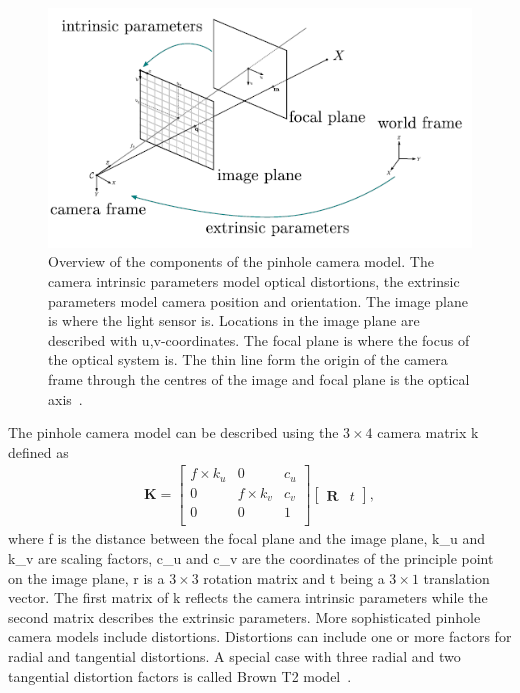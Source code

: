 \begin{figure}[htb]
    \centering
    \includegraphics[width=.85\textwidth]{doc/thesis/0_figures/sfm/pinholeCamera.png}
    \caption{Overview of the components of the pinhole camera model. The camera intrinsic parameters model optical distortions, the extrinsic parameters model camera position and orientation. The image plane is where the light sensor is. Locations in the image plane are described with u,v-coordinates. The focal plane is where the focus of the optical system is. The thin line form the origin of the camera frame through the centres of the image and focal plane is the optical axis~\cite{OpenMVGCameras}.}
    \label{fig:pinhole_cam}
\end{figure} 

The pinhole camera model can be described using the $3\times4$ camera matrix \gls{k} defined as
\begin{align}
    \textbf{K} = \begin{bmatrix}
        f\times k_u & 0           & c_u \\
        0           & f\times k_v & c_v \\
        0           & 0           & 1   \\
    \end{bmatrix} 
    \begin{bmatrix}
        \textbf{R} & t
    \end{bmatrix}, \label{eq:camera_m}
\end{align}
where \gls{f} is the distance between the focal plane and the image plane, \gls{k_u} and \gls{k_v} are scaling factors, \gls{c_u} and \gls{c_v} are the coordinates of the principle point on the image plane, \gls{r} is a $3\times3$ rotation matrix and \gls{t} being a $3\times1$ translation vector. The first matrix of \gls{k} reflects the camera intrinsic parameters while the second matrix describes the extrinsic parameters.
More sophisticated pinhole camera models include distortions. Distortions can include one or more factors for radial and tangential distortions. A special case with three radial and two tangential distortion factors is called Brown T2 model~\cite{OpenMVGCameras, sturmCameraModel}.

